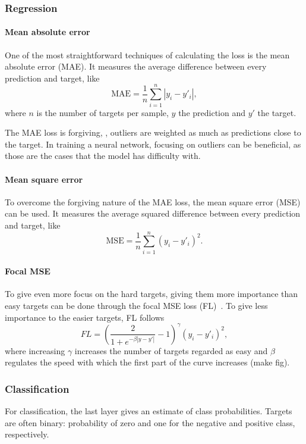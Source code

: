 \subsubsection{Regression}

\paragraph{Mean absolute error}
One of the most straightforward techniques of calculating the loss is the mean absolute error (MAE).
It measures the average difference between every prediction and target, like
\begin{equation}
    \mathrm{MAE} = \frac{1}{n} \sum_{i=1}^{n} |y_i - y'_i|,
\end{equation}
where $n$ is the number of targets per sample, $y$ the prediction and $y'$ the target.

The MAE loss is forgiving, \ie, outliers are weighted as much as predictions close to the target.
In training a neural network, focusing on outliers can be beneficial, as those are the cases that the model has difficulty with.

\paragraph{Mean square error}
To overcome the forgiving nature of the MAE loss, the mean square error (MSE) can be used.
It measures the average squared difference between every prediction and target, like
\begin{equation}
    \mathrm{MSE} = \frac{1}{n} \sum_{i=1}^n (y_i - y'_i)^2.
\end{equation}

\paragraph{Focal MSE}
To give even more focus on the hard targets, giving them more importance than easy targets can be done through the focal MSE loss (FL)~\cite{Lu2022}.
To give less importance to the easier targets, FL follows
\begin{equation}
    FL = \left(\frac{2}{1 + e^{-\beta |y - y'|}} - 1 \right)^\gamma (y_i - y'_i)^2,
\end{equation}
where increasing $\gamma$ increases the number of targets regarded as easy and $\beta$ regulates the speed with which the first part of the curve increases (make fig).

\subsubsection{Classification}
For classification, the last layer gives an estimate of class probabilities.
Targets are often binary: probability of zero and one for the negative and positive class, respectively.

